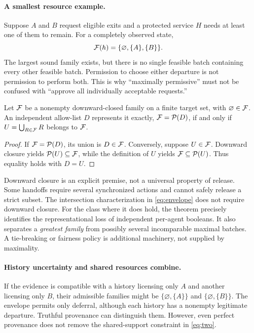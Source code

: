 \paragraph{A smallest resource example.}
Suppose $A$ and $B$ request eligible exits and a protected service $H$ needs at least one of them to remain. For a completely observed state,
\begin{equation}
\mathcal F(h)=\{\varnothing,\{A\},\{B\}\}.
\label{eq:two}
\end{equation}
The largest sound family exists, but there is no single feasible batch containing every other feasible batch. Permission to choose either departure is not permission to perform both. This is why ``maximally permissive'' must not be confused with ``approve all individually acceptable requests.''

\begin{theorem}
Let $\mathcal F$ be a nonempty downward-closed family on a finite target set, with $\varnothing\in\mathcal F$. An independent allow-list $D$ represents it exactly, $\mathcal F=\mathcal P(D)$, if and only if $U=\bigcup_{R\in\mathcal F}R$ belongs to $\mathcal F$.
\end{theorem}
\begin{proof}
If $\mathcal F=\mathcal P(D)$, its union is $D\in\mathcal F$. Conversely, suppose $U\in\mathcal F$. Downward closure yields $\mathcal P(U)\subseteq\mathcal F$, while the definition of $U$ yields $\mathcal F\subseteq\mathcal P(U)$. Thus equality holds with $D=U$.
\end{proof}

Downward closure is an explicit premise, not a universal property of release. Some handoffs require several synchronized actions and cannot safely release a strict subset. The intersection characterization in \cref{eq:envelope} does not require downward closure. For the class where it does hold, the theorem precisely identifies the representational loss of independent per-agent booleans. It also separates a \emph{greatest family} from possibly several incomparable maximal batches. A tie-breaking or fairness policy is additional machinery, not supplied by maximality.

\paragraph{History uncertainty and shared resources combine.}
If the evidence is compatible with a history licensing only $A$ and another licensing only $B$, their admissible families might be $\{\varnothing,\{A\}\}$ and $\{\varnothing,\{B\}\}$. The envelope permits only deferral, although each history has a nonempty legitimate departure. Truthful provenance can distinguish them. However, even perfect provenance does not remove the shared-support constraint in \cref{eq:two}.

